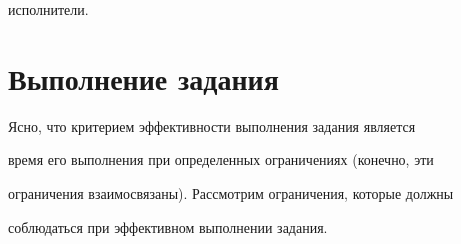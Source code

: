 исполнители. 





\section{Выполнение задания}





      Ясно, что критерием эффективности выполнения задания является 


время его выполнения при определенных ограничениях (конечно, эти 


ограничения взаимосвязаны). Рассмотрим ограничения, которые должны 


соблюдаться при эффективном выполнении задания.



